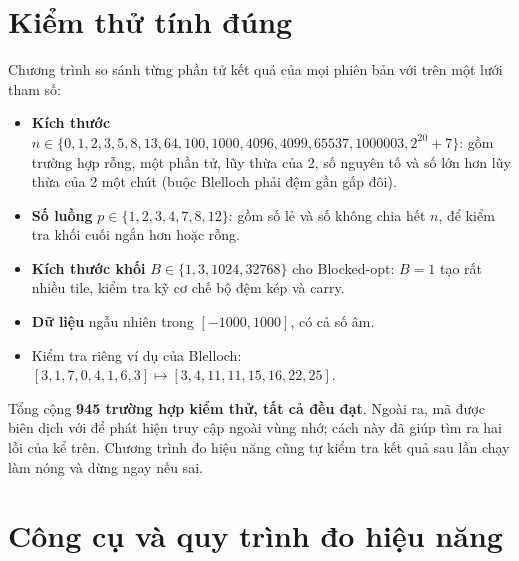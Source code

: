 \section{Kiểm thử tính đúng}
\label{sec:impl-test}

Chương trình  so sánh từng phần tử kết quả của mọi phiên bản với
 trên một lưới tham số:
\begin{itemize}
  \item \textbf{Kích thước} \(n \in \{0, 1, 2, 3, 5, 8, 13, 64, 100, 1000, 4096, 4099, 65537,
        1000003, 2^{20}+7\}\): gồm trường hợp rỗng, một phần tử, lũy thừa của 2, số nguyên tố và
        số lớn hơn lũy thừa của 2 một chút (buộc Blelloch phải đệm gần gấp đôi).
  \item \textbf{Số luồng} \(p \in \{1, 2, 3, 4, 7, 8, 12\}\): gồm số lẻ và số không chia hết
        \(n\), để kiểm tra khối cuối ngắn hơn hoặc rỗng.
  \item \textbf{Kích thước khối} \(B \in \{1, 3, 1024, 32768\}\) cho Blocked-opt: \(B = 1\) tạo
        rất nhiều tile, kiểm tra kỹ cơ chế bộ đệm kép và carry.
  \item \textbf{Dữ liệu} ngẫu nhiên trong \([-1000, 1000]\), có cả số âm.
  \item Kiểm tra riêng ví dụ của Blelloch: \([3,1,7,0,4,1,6,3] \mapsto [3,4,11,11,15,16,22,25]\).
\end{itemize}
Tổng cộng \textbf{945 trường hợp kiểm thử, tất cả đều đạt}. Ngoài ra, mã được biên dịch với
 để phát hiện truy cập ngoài vùng nhớ; cách này đã giúp tìm ra hai lỗi
của  kể trên. Chương trình đo hiệu năng cũng tự kiểm tra kết quả sau lần chạy làm
nóng và dừng ngay nếu sai.

\section{Công cụ và quy trình đo hiệu năng}
\label{sec:impl-bench}

